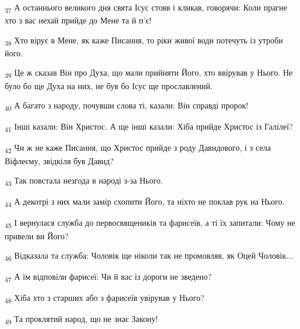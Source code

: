 \begin{tcolorbox}
\textsubscript{37} А останнього великого дня свята Ісус стояв і кликав, говорячи: Коли прагне хто з вас нехай прийде до Мене та й п'є!
\end{tcolorbox}
\begin{tcolorbox}
\textsubscript{38} Хто вірує в Мене, як каже Писання, то ріки живої води потечуть із утроби його.
\end{tcolorbox}
\begin{tcolorbox}
\textsubscript{39} Це ж сказав Він про Духа, що мали прийняти Його, хто ввірував у Нього. Не було бо ще Духа на них, не був бо Ісус ще прославлений.
\end{tcolorbox}
\begin{tcolorbox}
\textsubscript{40} А багато з народу, почувши слова ті, казали: Він справді пророк!
\end{tcolorbox}
\begin{tcolorbox}
\textsubscript{41} Інші казали: Він Христос. А ще інші казали: Хіба прийде Христос із Галілеї?
\end{tcolorbox}
\begin{tcolorbox}
\textsubscript{42} Чи ж не каже Писання, що Христос прийде з роду Давидового, і з села Віфлеєму, звідкіля був Давид?
\end{tcolorbox}
\begin{tcolorbox}
\textsubscript{43} Так повстала незгода в народі з-за Нього.
\end{tcolorbox}
\begin{tcolorbox}
\textsubscript{44} А декотрі з них мали замір схопити Його, та ніхто не поклав рук на Нього.
\end{tcolorbox}
\begin{tcolorbox}
\textsubscript{45} І вернулася служба до первосвящеників та фарисеїв, а ті їх запитали: Чому не привели ви Його?
\end{tcolorbox}
\begin{tcolorbox}
\textsubscript{46} Відказала та служба: Чоловік ще ніколи так не промовляв, як Оцей Чоловік...
\end{tcolorbox}
\begin{tcolorbox}
\textsubscript{47} А їм відповіли фарисеї: Чи й вас із дороги не зведено?
\end{tcolorbox}
\begin{tcolorbox}
\textsubscript{48} Хіба хто з старших або з фарисеїв увірував у Нього?
\end{tcolorbox}
\begin{tcolorbox}
\textsubscript{49} Та проклятий народ, що не знає Закону!
\end{tcolorbox}
